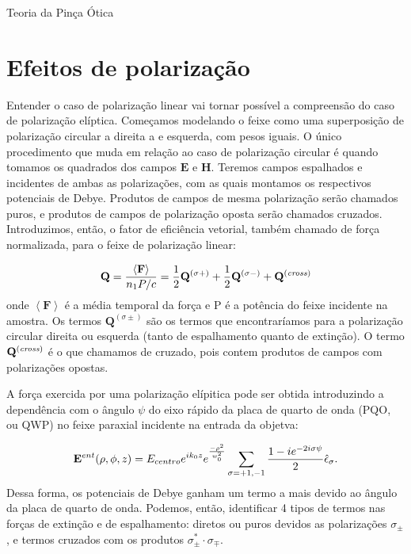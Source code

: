 \begin{chapter}{Teoria da Pinça Ótica}
%
%
%
%
\section{Efeitos de polarização}
\label{Efeitos de polarizacao}

\hspace{5 mm}Entender o caso de polarização linear vai tornar possível a compreensão do caso de polarização elíptica. Começamos modelando o feixe como uma superposição de polarização circular a direita a e esquerda, com pesos iguais. O único procedimento que muda em relação ao caso de polarização circular é quando tomamos os quadrados dos campos ${\mathbf E}$ e ${\mathbf H}$. Teremos campos espalhados e incidentes de ambas as polarizações, com as quais montamos os respectivos potenciais de Debye. Produtos de campos de mesma polarização serão chamados puros, e produtos de campos de polarização oposta serão chamados cruzados. Introduzimos, então, o fator de eficiência vetorial, também chamado de força normalizada, para o feixe de polarização linear:

\begin{equation}
{\mathbf Q} = \frac{\left<{\mathbf F}\right>}{n_1 P/c}= \frac{1}{2}{\mathbf Q}^{(\sigma +)} + \frac{1}{2}{\mathbf Q}^{(\sigma -)} + {\mathbf Q}^{({\it cross})}
\label{fatoref_forca}
\end{equation}
%
onde $\left<{\mathbf F}\right>$ é a média temporal da força e P é a potência do feixe incidente na amostra. Os termos ${\mathbf Q}^{(\sigma \pm)}$ são os termos que encontraríamos para a polarização circular direita ou esquerda (tanto de espalhamento quanto de extinção). O termo ${\mathbf Q}^{({\it cross})}$ é o que chamamos de cruzado, pois contem produtos de campos com polarizações opostas. 

A força exercida por uma polarização elípitica pode ser obtida introduzindo a dependência com o ângulo $\psi$ do eixo rápido da placa de quarto de onda (PQO, ou QWP) no feixe paraxial incidente na entrada da objetva:

\begin{equation}
{\mathbf E}^{ent}(\rho,\phi,z) = E_{centro} e^{ik_0z} e^{\frac{-\rho^2}{w_0^2}} \sum \limits_{\sigma = +1,-1} \frac{1 - ie^{-2i\sigma \psi}}{2} \hat{\bf{\epsilon}}_\sigma .
\label{l}
\end{equation}
%
Dessa forma, os potenciais de Debye ganham um termo a mais devido ao ângulo da placa de quarto de onda. Podemos, então, identificar 4 tipos de termos nas forças de extinção e de espalhamento: diretos ou puros devidos as polarizações $\sigma_\pm$, e termos cruzados com os produtos $\sigma_\pm^*\cdot\sigma_\mp$.


\end{chapter}
